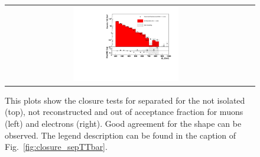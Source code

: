 \begin{figure}[tbhn]
\begin{center}
\begin{tabular}{cc}
\includegraphics[width=0.45\textwidth]{lostlepton/plots/closure/MHTwAccE.pdf}\\
\end{tabular}
\end{center}
\caption{This plots show the closure tests for \wpj separated for the not isolated (top), not reconstructed and out of acceptance fraction for muons (left) and electrons (right). Good agreement for the shape can be observed. The legend description can be found in the caption of Fig.~\ref{fig:closure_sepTTbar}.}
\label{fig:closure_w_sep_MHT}
\end{figure}

